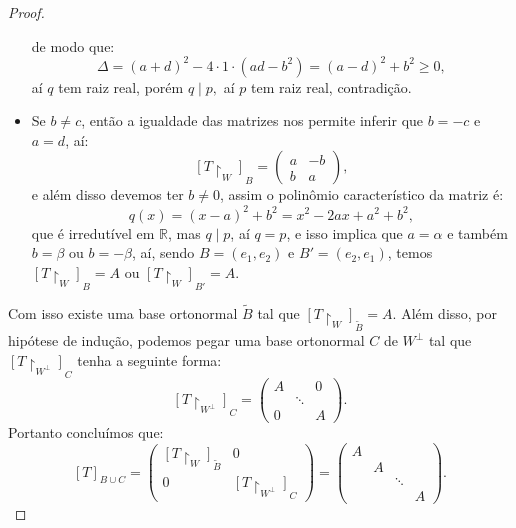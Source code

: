 \documentclass[11pt,twoside,a4paper]{book}
\begin{document}
\begin{proof}
\begin{itemize}
\[\]
de modo que:
\[
\Delta=(a+d)^2-4\cdot1\cdot(ad-b^2)=(a-d)^2+b^2\geq 0,
\]
aí $q$ tem raiz real, porém $q\mid p,$ aí $p$ tem raiz real, contradição.
\item Se $b\neq c$, então a igualdade das matrizes nos permite inferir que $b=-c$ e $a=d$, aí:
\[
[T\upharpoonright_W]_B=\begin{pmatrix}
a&-b\\b&a
\end{pmatrix},
\]
e além disso devemos ter $b\neq 0$, assim o polinômio característico da matriz é:
\[
q(x)=(x-a)^2+b^2=x^2-2ax+a^2+b^2,
\]
que é irredutível em $\mathbb{R}$, mas $q\mid p$, aí $q=p$, e isso implica que $a=\alpha$ e também $b=\beta$ ou $b=-\beta$, aí, sendo $B=(e_1,e_2)$ e $B'=(e_2,e_1)$, temos $[T\upharpoonright_W]_{B}=A$ ou $[T\upharpoonright_W]_{B'}=A$.
\end{itemize}
Com isso existe uma base ortonormal $\tilde{B}$ tal que $[T\upharpoonright_W]_{\tilde{B}}=A$. Além disso, por hipótese de indução, podemos pegar uma base ortonormal $C$ de $W^\perp$ tal que $[T\upharpoonright_{W^\perp}]_C$ tenha a seguinte forma:
\[
[T\upharpoonright_{W^\perp}]_C=\begin{pmatrix}
A&&0\\&\ddots&\\0&&A
\end{pmatrix}.
\]
Portanto concluímos que:
\[
[T]_{B\cup C}=\begin{pmatrix}
[T\upharpoonright_W]_{\tilde{B}}&0\\0&[T\upharpoonright_{W^\perp}]_C
\end{pmatrix}=\begin{pmatrix}
A&&&\\&A&&\\&&\ddots&\\&&&A
\end{pmatrix}.
\]
\end{proof}
\end{document}
